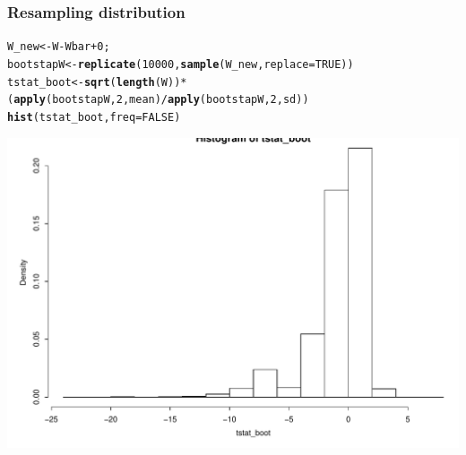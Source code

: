 \documentclass{beamer}\usepackage[]{graphicx}\usepackage[]{color}
\makeatletter
\newcommand{\hlnum}[1]{\textcolor[rgb]{0.2,0.2,0.2}{#1}}%
\newcommand{\hlopt}[1]{\textcolor[rgb]{0.102,0.102,0.102}{#1}}%
\newcommand{\hlstd}[1]{\textcolor[rgb]{0.102,0.102,0.102}{#1}}%
\newcommand{\hlkwb}[1]{\textcolor[rgb]{0.102,0.102,0.102}{#1}}%
\newcommand{\hlkwc}[1]{\textcolor[rgb]{0.2,0.2,0.2}{#1}}%
\newcommand{\hlkwd}[1]{\textcolor[rgb]{0.102,0.102,0.102}{\textbf{#1}}}%
\newenvironment{kframe}{%
 \def\at@end@of@kframe{}%
 \ifinner\ifhmode%
  \def\at@end@of@kframe{\end{minipage}}%
  \begin{minipage}{\columnwidth}%
 \fi\fi%
 \def\FrameCommand##1{\hskip\@totalleftmargin \hskip-\fboxsep
 \colorbox{shadecolor}{##1}\hskip-\fboxsep
     \hskip-\linewidth \hskip-\@totalleftmargin \hskip\columnwidth}%
 \MakeFramed {\advance\hsize-\width
   \@totalleftmargin\z@ \linewidth\hsize
   \@setminipage}}%
 {\par\unskip\endMakeFramed%
 \at@end@of@kframe}
\newenvironment{knitrout}{}{} %
\renewenvironment{knitrout}{\begin{spacing}{0.75}\begin{tiny}}{\end{tiny}\end{spacing}}
\makeatother
\begin{document}
\begin{frame}[fragile]
\frametitle{Resampling distribution}

\begin{knitrout}\small
{}\color{fgcolor}\begin{kframe}
\begin{alltt}
\hlstd{W_new} \hlkwb{<-} \hlstd{W} \hlopt{-} \hlstd{Wbar} \hlopt{+} \hlnum{0}\hlstd{;}
\hlstd{bootstapW} \hlkwb{<-} \hlkwd{replicate}\hlstd{(}\hlnum{10000}\hlstd{,} \hlkwd{sample}\hlstd{(W_new,} \hlkwc{replace}\hlstd{=}\hlnum{TRUE}\hlstd{))}
\hlstd{tstat_boot} \hlkwb{<-} \hlkwd{sqrt}\hlstd{(}\hlkwd{length}\hlstd{(W))}\hlopt{*}
              \hlstd{(}\hlkwd{apply}\hlstd{(bootstapW,} \hlnum{2}\hlstd{, mean)}\hlopt{/}\hlkwd{apply}\hlstd{(bootstapW,}\hlnum{2}\hlstd{, sd))}
\hlkwd{hist}\hlstd{(tstat_boot,} \hlkwc{freq}\hlstd{=}\hlnum{FALSE}\hlstd{)}
\end{alltt}
\end{kframe}

{\centering \includegraphics[width=0.99\linewidth]{figure/graphics-unnamed-chunk-2-1} 

}



\end{knitrout}

\end{frame}
\end{document}
